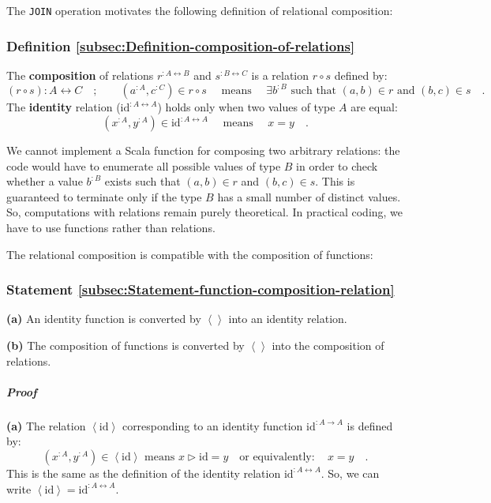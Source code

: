 The \lstinline!JOIN! operation motivates the following definition
of relational composition:

\subsubsection{Definition \label{subsec:Definition-composition-of-relations}\ref{subsec:Definition-composition-of-relations}}

The \textbf{composition} of relations $r^{:A\leftrightarrow B}$ and
$s^{:B\leftrightarrow C}$ is a relation $r\circ s$ defined by:
\[
(r\circ s):A\leftrightarrow C\quad;\quad\quad(a^{:A},c^{:C})\in r\circ s\quad\text{ means }\quad\exists b^{:B}\text{ such that }(a,b)\in r\text{ and }(b,c)\in s\quad.
\]
The \textbf{identity} relation ($\text{id}^{:A\leftrightarrow A}$)
holds only when two values of type $A$ are equal:
\[
(x^{:A},y^{:A})\in\text{id}^{:A\leftrightarrow A}\quad\text{ means }\quad x=y\quad.
\]

We cannot implement a Scala function for composing two arbitrary relations:
the code would have to enumerate all possible values of type $B$
in order to check whether a value $b^{:B}$ exists such that $(a,b)\in r$
and $(b,c)\in s$. This is guaranteed to terminate only if the type
$B$ has a small number of distinct values. So, computations with
relations remain purely theoretical. In practical coding, we have
to use functions rather than relations.

The relational composition is compatible with the composition of functions:

\subsubsection{Statement \label{subsec:Statement-function-composition-relation}\ref{subsec:Statement-function-composition-relation}}

\textbf{(a)} An identity function is converted by $\left<\right>$
into an identity relation.

\textbf{(b)} The composition of functions is converted by $\left<\right>$
into the composition of relations.

\subparagraph{Proof}

\textbf{(a)} The relation $\left<\text{id}\right>$ corresponding
to an identity function $\text{id}^{:A\rightarrow A}$ is defined
by:
\[
(x^{:A},y^{:A})\in\left<\text{id}\right>\text{ means }x\triangleright\text{id}=y\quad\text{or equivalently}:\quad x=y\quad.
\]
This is the same as the definition of the identity relation $\text{id}^{:A\leftrightarrow A}$.
So, we can write $\left<\text{id}\right>=\text{id}^{:A\leftrightarrow A}$.

